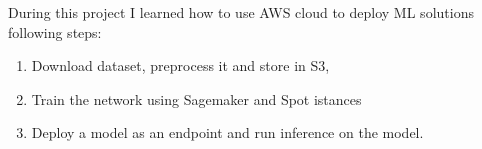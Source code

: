 \documentclass{article}
\begin{document}
During this project I learned how to use AWS cloud to deploy ML solutions following steps:
\begin{enumerate}
	\item Download dataset, preprocess it and store in S3,
	\item Train the network using Sagemaker and Spot istances
	\item Deploy a model as an endpoint and run inference on the model.
\end{enumerate}
\end{document}
